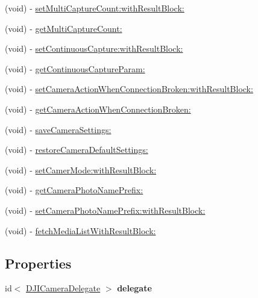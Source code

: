 \begin{DoxyCompactItemize}
\item 
(void) -\/ \hyperlink{interface_d_j_i_camera_a24deec8c2d2c3400fb429d3970b118a8}{set\+Multi\+Capture\+Count\+:with\+Result\+Block\+:}
\item 
(void) -\/ \hyperlink{interface_d_j_i_camera_aadf6c311c34ca3350c499ffebfa56360}{get\+Multi\+Capture\+Count\+:}
\item 
(void) -\/ \hyperlink{interface_d_j_i_camera_a1778f87e60ea80287eeac26bc5ce20c1}{set\+Continuous\+Capture\+:with\+Result\+Block\+:}
\item 
(void) -\/ \hyperlink{interface_d_j_i_camera_a24a0b6d29efc68288434cc7f8dd9820a}{get\+Continuous\+Capture\+Param\+:}
\item 
(void) -\/ \hyperlink{interface_d_j_i_camera_a71e8465d77880dbd1e6503b1c053a3c8}{set\+Camera\+Action\+When\+Connection\+Broken\+:with\+Result\+Block\+:}
\item 
(void) -\/ \hyperlink{interface_d_j_i_camera_ad0a73beaa9c1a8f4d3f671cd502709a4}{get\+Camera\+Action\+When\+Connection\+Broken\+:}
\item 
(void) -\/ \hyperlink{interface_d_j_i_camera_a6ecf06b591c070b0802c750e146a7083}{save\+Camera\+Settings\+:}
\item 
(void) -\/ \hyperlink{interface_d_j_i_camera_ae9dfbd7729c65f2c2b38375a31741945}{restore\+Camera\+Default\+Settings\+:}
\item 
(void) -\/ \hyperlink{interface_d_j_i_camera_a9c3024a4d659577b916421429a9ed1fe}{set\+Camer\+Mode\+:with\+Result\+Block\+:}
\item 
(void) -\/ \hyperlink{interface_d_j_i_camera_aa7aa0fa592b6b7ffdd403308e7896f71}{get\+Camera\+Photo\+Name\+Prefix\+:}
\item 
(void) -\/ \hyperlink{interface_d_j_i_camera_a9825d0b6c5f400877d1d8761fdd0de57}{set\+Camera\+Photo\+Name\+Prefix\+:with\+Result\+Block\+:}
\item 
(void) -\/ \hyperlink{interface_d_j_i_camera_aec60d27962d501aacd4a1324adca0775}{fetch\+Media\+List\+With\+Result\+Block\+:}
\end{DoxyCompactItemize}
\subsection*{Properties}
\begin{DoxyCompactItemize}
\item 
\hypertarget{interface_d_j_i_camera_a7b8c8c19d3041aac44699c37ac94a784}{id$<$ \hyperlink{protocol_d_j_i_camera_delegate-p}{D\+J\+I\+Camera\+Delegate} $>$ {\bfseries delegate}}\label{interface_d_j_i_camera_a7b8c8c19d3041aac44699c37ac94a784}

\end{DoxyCompactItemize}


